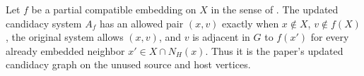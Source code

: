\begin{definition}
Let $f$ be a partial compatible embedding on $X$ in the sense of .  The updated candidacy system $A_f$ has an allowed pair $(x,v)$ exactly when $x\notin X$, $v\notin f(X)$, the original system allows $(x,v)$, and $v$ is adjacent in $G$ to $f(x')$ for every already embedded neighbor $x'\in X\cap N_H(x)$.  Thus it is the paper's updated candidacy graph on the unused source and host vertices.
\end{definition}
